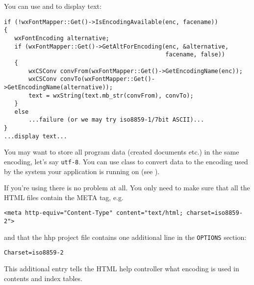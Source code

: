 
You can use  and 
 to display text:

\begin{verbatim}
if (!wxFontMapper::Get()->IsEncodingAvailable(enc, facename))
{
   wxFontEncoding alternative;
   if (wxFontMapper::Get()->GetAltForEncoding(enc, &alternative,
                                              facename, false))
   {
       wxCSConv convFrom(wxFontMapper::Get()->GetEncodingName(enc));
       wxCSConv convTo(wxFontMapper::Get()->GetEncodingName(alternative));
       text = wxString(text.mb_str(convFrom), convTo);
   }
   else
       ...failure (or we may try iso8859-1/7bit ASCII)...
}
...display text...
\end{verbatim}


You may want to store all program data (created documents etc.) in
the same encoding, let's say {\tt utf-8}. You can use
 class to convert data to the encoding used by the
system your application is running on (see
).


If you're using  there is
no problem at all. You only need to make sure that all the HTML files contain
the META tag, e.g.

\begin{verbatim}
<meta http-equiv="Content-Type" content="text/html; charset=iso8859-2">
\end{verbatim}

and that the hhp project file contains one additional line in the {\tt OPTIONS}
section:

\begin{verbatim}
Charset=iso8859-2
\end{verbatim}

This additional entry tells the HTML help controller what encoding is used
in contents and index tables.

